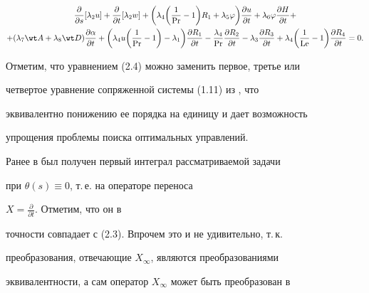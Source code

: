 \begin{multline} 


\frac{\partial}{\partial s}[\lambda_2u]+ 


\frac{\partial}{\partial t}[\lambda_2w]+ 


\bigg(\lambda_4\bigg(\frac{1}{\PR}-1\bigg)R_1+ 


\lambda_5\varphi\bigg)\frac{\partial u}{\partial t}+ 


\lambda_6\varphi\frac{\partial H}{\partial t}+\\ 


% 


+(\lambda_7\wt A+\lambda_8\wt D) 


\frac{\partial\alpha}{\partial t}+\bigg(\lambda_4u 


\bigg(\frac{1}{\PR}-1\bigg)-\lambda_1\bigg) 


\frac{\partial R_1}{\partial t}- 


\frac{\lambda_4}{\PR}\frac{\partial R_2}{\partial t}- 


\lambda_3\frac{\partial R_3}{\partial t}+\lambda_4\bigg( 


\frac{1}{\Le}-1\bigg) 


\frac{\partial R_4}{\partial t}=0. 


\end{multline} 


 


Отметим, что уравнением (2.4) можно заменить первое, третье или 


четвертое уравнение сопряженной системы (1.11) из \cite{2}, что 


эквивалентно понижению ее порядка на единицу и дает возможность 


упрощения проблемы поиска оптимальных управлений. 


 


Ранее в \cite{2} был получен первый интеграл рассматриваемой задачи 


при $\theta(s)\equiv0$, т.\,е. на операторе переноса 


$X=\frac{\partial}{\partial t}$. Отметим, что он в 


точности совпадает с (2.3). Впрочем это и не удивительно, т.\,к. 


преобразования, отвечающие $X_\infty$, являются преобразованиями 


эквивалентности, а сам оператор $X_\infty$ может быть преобразован в 



